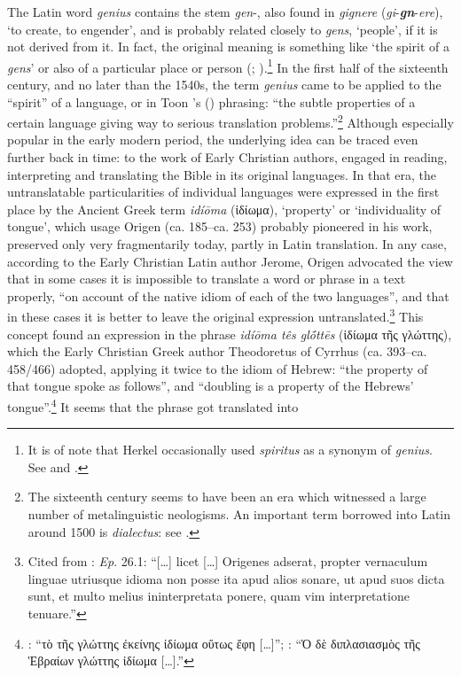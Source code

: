 The Latin word \textit{genius} contains the stem \textit{gen}-, also found in \textit{gignere} (\textit{gi}-\textbf{\textit{gn}}-\textit{ere}), ‘to create, to engender’, and is probably related closely to \textit{gens}, ‘people’, if it is not derived from it. In fact, the original meaning is something like ‘the spirit of a \textit{gens}’ or also of a particular place or person (\cite[\textit{s.v. genius}]{lewis_latin_1879}; \cite[260--261]{de_vaan_etymological_2008}).\footnote{It is of note that Herkel occasionally used \textit{spiritus} as a synonym of \textit{genius}. See \citet[54, 61, 138]{herkel_elementa_1826} and \citet{buzassyova_wissenschaftliche_2012}.} In the first half of the sixteenth century, and no later than the 1540s, the term \textit{genius} came to be applied to the “spirit” of a language, or in Toon \citeauthor{van_hal_genie_2013}’s (\citeyear[92]{van_hal_genie_2013}) phrasing: “the subtle properties of a certain language giving way to serious translation problems.”\footnote{The sixteenth century seems to have been an era which witnessed a large number of metalinguistic neologisms. An important term borrowed into Latin around 1500 is \textit{dialectus}: see \citet{van_rooy__2019}.} Although especially popular in the early modern period, the underlying idea can be traced even further back in time: to the work of Early Christian authors, engaged in reading, interpreting and translating the Bible in its original languages. In that era, the untranslatable particularities of individual languages were expressed in the first place by the Ancient Greek term \textit{idíōma} (ἰδίωμα), ‘property’ or ‘individuality of tongue’, which usage Origen (ca. 185--ca. 253) probably pioneered in his work, preserved only very fragmentarily today, partly in Latin translation. In any case, according to the Early Christian Latin author Jerome, Origen advocated the view that in some cases it is impossible to translate a word or phrase in a text properly, “on account of the native idiom of each of the two languages”, and that in these cases it is better to leave the original expression untranslated.\footnote{Cited from \citet[52]{bartelink_hieronymus_1980}: \textit{Ep}. 26.1: “[…] licet […] Origenes adserat, propter vernaculum linguae utriusque idioma non posse ita apud alios sonare, ut apud suos dicta sunt, et multo melius ininterpretata ponere, quam vim interpretatione tenuare.”} This concept found an expression in the phrase \textit{idíōma tês glṓttēs} (ἰδίωμα τῆς γλώττης), which the Early Christian Greek author Theodoretus of Cyrrhus (ca. 393--ca. 458/466) adopted, applying it twice to the idiom of Hebrew: “the property of that tongue spoke as follows”, and “doubling is a property of the Hebrews’ tongue”.\footnote{\citet[15]{fernandez_marcos_theodoreti_1979}: “τὸ τῆς γλώττης ἐκείνης ἰδίωμα οὕτως ἔφη […]”; \citet[81, 1145]{migne_patrologiae_1857}: “Ὁ δὲ διπλασιασμὸς τῆς Ἑβραίων γλώττης ἰδίωμα […].”} It seems that the phrase got translated into 